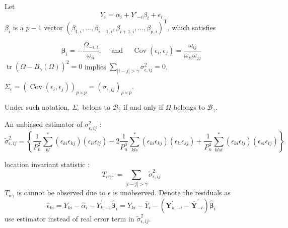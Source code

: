 \documentclass{beamer}
\begin{document}
\begin{frame}

Let \[
Y_i=\alpha_i+Y'_{-i}\beta_i+\epsilon_i
\] \(\beta_i\) is a \(p-1\) vector
\(\left( \beta _ { 1 , i } , \ldots , \beta _ { i - 1 , i } , \beta _ { i + 1 , i } , \ldots , \beta _ { p , i } \right) ^ { \mathrm { T } }\),
which satisfies

\[
\boldsymbol { \beta } _ { i } = - \frac { \Omega _ { - i , i } } { \omega _ { i i } } , \quad \text { and } \quad \operatorname { Cov } \left( \epsilon _ { i } , \epsilon _ { j } \right) = \frac { \omega _ { i j } } { \omega _ { i i } \omega _ { j j } }
\]
\(\operatorname { tr } \left( \Omega - B _ { \gamma } ( \Omega ) \right) ^ { 2 } = 0\)
implies
\(\sum _ { | i - j | > \gamma } \sigma _ { \epsilon , i j } ^ { 2 }=0\).

\(\Sigma _ { \epsilon } = \left( \operatorname { Cov } \left( \epsilon _ { i } , \epsilon _ { j } \right) \right) _ { p \times p } = \left( \sigma _ { \epsilon , i j } \right) _ { p \times p }\).

\end{frame}

\begin{frame}

Under such notation, \(\Sigma_\epsilon\) belons to \(\mathcal B_\gamma\)
if and only if \(\Omega\) belongs to \(\mathcal B_\gamma\).

An unbiased estimator of \(\sigma _ { \epsilon , i j } ^ { 2 }\) : \[
\tilde { \sigma } _ { \epsilon , i j } ^ { 2 } = \left\{ \frac { 1 } { P _ { n } ^ { 2 } } \sum _ { k l } ^ { * } \left( \epsilon _ { k i } \epsilon _ { k j } \right) \left( \epsilon _ { l i } \epsilon _ { l j } \right) - 2 \frac { 1 } { P _ { n } ^ { 3 } } \sum _ { k l s } ^ { * } \left( \epsilon _ { k i } \epsilon _ { k j } \right) \left( \epsilon _ { l i } \epsilon _ { s j } \right) + \frac { 1 } { P _ { n } ^ { 4 } } \sum _ { k l s t } ^ { * } \left( \epsilon _ { k i } \epsilon _ { l j } \right) \left( \epsilon _ { s i } \epsilon _ { t j } \right) \right\}
\]

location invariant statistic : \[
T _ { n \gamma } : = \sum _ { | i - j | > \gamma } \tilde { \sigma } _ { \epsilon , i j } ^ { 2 }
\] \(T_{n\gamma}\) is cannot be observed due to \(\epsilon\) is
unobserved. Denote the residuals as \[
\hat { \epsilon } _ { k i } = Y _ { k i } - \hat { \alpha } _ { i } - Y _ { k , - i } ^ { \prime } \hat { \boldsymbol { \beta } } _ { i } = Y _ { k i } - \overline { Y } _ { i } - \left( \boldsymbol { Y } _ { k , - i } ^ { \prime } - \overline { \boldsymbol { Y } } _ { - i } ^ { \prime } \right) \hat { \boldsymbol { \beta } } _ { i }
\] use estimator instead of real error term in
\(\tilde \sigma^2_{\epsilon,ij}\).

\end{frame}
\end{document}
